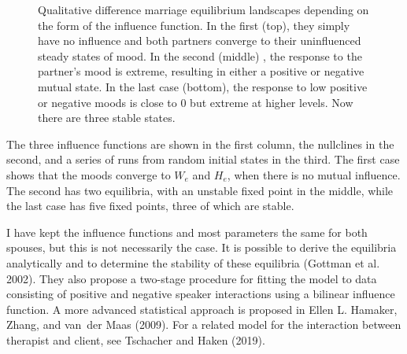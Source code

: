 \documentclass[
  a4paper,
  DIV=11,
  numbers=noendperiod,
  oneside]{scrreprt}
\begin{document}
\begin{figure}


\caption{\label{fig-ch4n-img10-old-58}Qualitative difference marriage
equilibrium landscapes depending on the form of the influence function.
In the first (top), they simply have no influence and both partners
converge to their uninfluenced steady states of mood. In the second
(middle) , the response to the partner's mood is extreme, resulting in
either a positive or negative mutual state. In the last case (bottom),
the response to low positive or negative moods is close to 0 but extreme
at higher levels. Now there are three stable states.}

\end{figure}%

The three influence functions are shown in the first column, the
nullclines in the second, and a series of runs from random initial
states in the third. The first case shows that the moods converge to
\(W_{e}\) and \(H_{e}\), when there is no mutual influence. The second
has two equilibria, with an unstable fixed point in the middle, while
the last case has five fixed points, three of which are stable.

I have kept the influence functions and most parameters the same for
both spouses, but this is not necessarily the case. It is possible to
derive the equilibria analytically and to determine the stability of
these equilibria (Gottman et al. 2002). They also propose a two-stage
procedure for fitting the model to data consisting of positive and
negative speaker interactions using a bilinear influence function. A
more advanced statistical approach is proposed in Ellen L. Hamaker,
Zhang, and van~der Maas (2009). For a related model for the interaction
between therapist and client, see Tschacher and Haken (2019).
\end{document}
